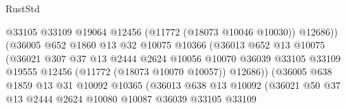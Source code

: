 \begin{lexlean}{RustStd}
\begin{coremodule}
                                        @33105
                                        @33109
                                        @19064
                                        @12456
                                        (@11772 (@18073 @10046 @10030))
                                        @12686))
                                    (@36005
                                      @652
                                      @1860
                                      @13
                                      @32
                                      @10075
                                      @10366
                                      (@36013
                                        @652
                                        @13
                                        @10075
                                        (@36021
                                          @307
                                          @37
                                          @13
                                          @2444
                                          @2624
                                          @10056
                                          @10070
                                          @36039
                                          @33105
                                          @33109
                                          @19555
                                          @12456
                                          (@11772 (@18073 @10070 @10057))
                                          @12686))
                                      (@36005
                                        @638
                                        @1859
                                        @13
                                        @31
                                        @10092
                                        @10365
                                        (@36013
                                          @638
                                          @13
                                          @10092
                                          (@36021
                                            @50
                                            @37
                                            @13
                                            @2444
                                            @2624
                                            @10080
                                            @10087
                                            @36039
                                            @33105
                                            @33109

\end{coremodule}
\end{lexlean}
